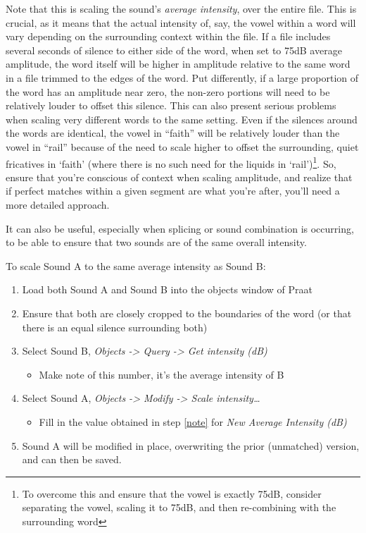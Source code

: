 Note that this is scaling the sound's \emph{average intensity}, over the
entire file. This is crucial, as it means that the actual intensity of,
say, the vowel within a word will vary depending on the surrounding
context within the file. If a file includes several seconds of silence
to either side of the word, when set to 75dB average amplitude, the word
itself will be higher in amplitude relative to the same word in a file
trimmed to the edges of the word. Put differently, if a large proportion
of the word has an amplitude near zero, the non-zero portions will need
to be relatively louder to offset this silence. This can also present
serious problems when scaling very different words to the same setting.
Even if the silences around the words are identical, the vowel in
``faith'' will be relatively louder than the vowel in ``rail'' because
of the need to scale higher to offset the surrounding, quiet fricatives
in `faith' (where there is no such need for the liquids in
`rail')\footnote{To overcome this and ensure that the vowel is exactly 75dB, consider separating the vowel, scaling it to 75dB, and then re-combining with the surrounding word}.
So, ensure that you're conscious of context when scaling amplitude, and
realize that if perfect matches within a given segment are what you're
after, you'll need a more detailed approach.

It can also be useful, especially when splicing or sound combination is
occurring, to be able to ensure that two sounds are of the same overall
intensity.

To scale Sound A to the same average intensity as Sound B:

\begin{enumerate}
\def\labelenumi{\arabic{enumi}.}
\tightlist
\item
  Load both Sound A and Sound B into the objects window of Praat
\item
  Ensure that both are closely cropped to the boundaries of the word (or
  that there is an equal silence surrounding both)
\item
  Select Sound B, \emph{Objects -\textgreater{} Query -\textgreater{}
  Get intensity (dB)}

  \begin{itemize}
  \tightlist
  \item
    \label{note}Make note of this number, it's the average intensity of
    B
  \end{itemize}
\item
  Select Sound A, \emph{Objects -\textgreater{} Modify -\textgreater{}
  Scale intensity\ldots{}}

  \begin{itemize}
  \tightlist
  \item
    Fill in the value obtained in step \ref{note} for \emph{New Average
    Intensity (dB)}
  \end{itemize}
\item
  Sound A will be modified in place, overwriting the prior (unmatched)
  version, and can then be saved.
\end{enumerate}

